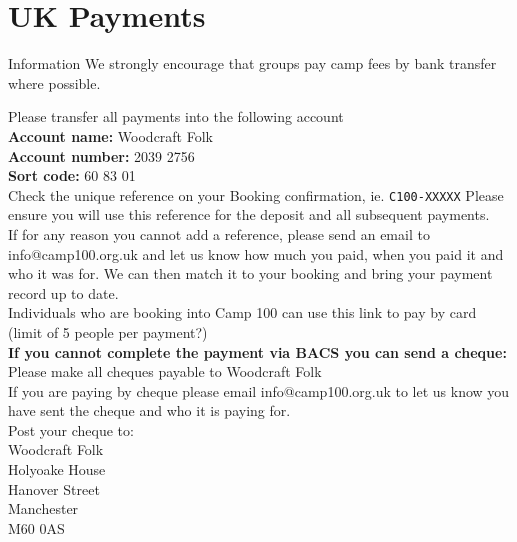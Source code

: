 \documentclass[a4paper, 11pt]{report}
\begin{document}
\makedocumenttitlepage

\tableofcontents

\chapter{UK Payments}

\begin{callout-green}{Information}
We strongly encourage that groups pay camp fees by bank transfer where possible.
\end{callout-green}

Please transfer all payments into the following account\\
\textbf{Account name:} Woodcraft Folk \\
\textbf{Account number:} 2039 2756\\
\textbf{Sort code:} 60 83 01\\

Check the unique reference on your Booking confirmation, ie. \verb|C100-XXXXX| Please ensure you will use this reference for the deposit and all subsequent payments.\\

If for any reason you cannot add a reference, please send an email to info@camp100.org.uk and let us know how much you paid, when you paid it and who it was for. We can then match it to your booking and bring your payment record up to date.\\

Individuals who are booking into Camp 100 can use this link to pay by card (limit of 5 people per payment?)\\

\textbf{If you cannot complete the payment via BACS you can send a cheque:}\\

Please make all cheques payable to Woodcraft Folk\\

If you are paying by cheque please email info@camp100.org.uk to let us know you have sent the cheque and who it is paying for. \\

Post your cheque to:\\
Woodcraft Folk\\
Holyoake House\\
Hanover Street\\
Manchester \\
M60 0AS\\
\end{document}
